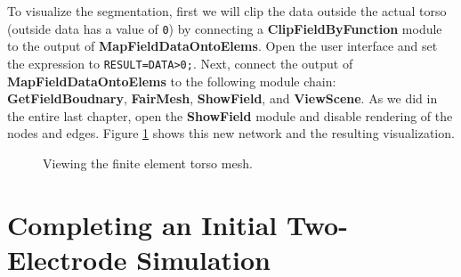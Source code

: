 \documentclass[fleqn,11pt,openany]{book}
\begin{document}
To visualize the segmentation, first we will clip the data outside the
actual torso (outside data has a value of {\tt 0}) by connecting a
{\bf ClipFieldByFunction} module to the output of {\bf
MapFieldDataOntoElems}. Open the user interface and set the expression
to {\tt RESULT=DATA>0;}. Next, connect the output of {\bf
MapFieldDataOntoElems} to the following module chain: {\bf
GetFieldBoudnary}, {\bf FairMesh}, {\bf ShowField}, and {\bf
ViewScene}. As we did in the entire last chapter, open the {\bf
ShowField} module and disable rendering of the nodes and edges. Figure
\ref{fig:defib_fem_nw_r_02} shows this new network and the resulting
visualization.

\begin{figure}
\caption{Viewing the finite element torso
mesh.}\label{fig:defib_fem_nw_r_02}
\end{figure}

\section{Completing an Initial Two-Electrode Simulation}
\end{document}
